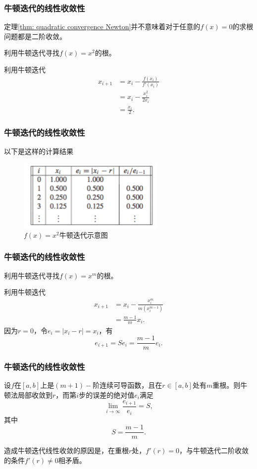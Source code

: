 \documentclass[10pt]{beamer}
\begin{document}
\begin{frame}
\frametitle{牛顿迭代的线性收敛性}
定理\ref{thm: quadratic convergence Newton}并不意味着对于任意的$f(x) = 0$的求根问题都是二阶收敛。
\begin{example}
利用牛顿迭代寻找$f(x) = x^2$的根。
\end{example}
利用牛顿迭代
\begin{align}
x_{i+1} & = x_i - \frac{f(x_i)}{f'(x_i)} \nonumber \\
            & = x_i - \frac{x_i^2}{2x_i} \nonumber \\
            & = \frac{x_i}{2}.
\end{align}
\end{frame}


\begin{frame}
\frametitle{牛顿迭代的线性收敛性}
以下是这样的计算结果
\begin{figure}
\includegraphics[width=6 cm]{figs/Newton_Ex_2_Results.png} 
\caption{$f(x) = x^2$牛顿迭代示意图} 
\end{figure}
\end{frame}


\begin{frame}
\frametitle{牛顿迭代的线性收敛性}
\begin{example}
利用牛顿迭代寻找$f(x) = x^m$的根。
\end{example}
利用牛顿迭代
\begin{align}
x_{i+1} & = x_i - \frac{x_i^m}{m(x_i^{m-1})} \nonumber \\
            & = \frac{m-1}{m} x_i.
\end{align}
因为$r = 0$，令$e_i = |x_i - r| = x_i$，有
\begin{equation}
e_{i+1} = S e_i = \frac{m-1}{m} e_i.
\end{equation}
\end{frame}

\begin{frame}
\frametitle{牛顿迭代的线性收敛性}
\begin{theorem}
设$f$在$[a,b]$上是$(m+1)-$阶连续可导函数，且在$r \in [a,b]$处有$m$重根。则牛顿法局部收敛到$r$，而第$i$步的误差的绝对值$e_i$满足
\begin{equation}
\lim_{i \rightarrow \infty} \frac{e_{i+1}}{e_i} = S,
\end{equation}
其中
\begin{equation}
S = \frac{m-1}{m}.
\end{equation}
\end{theorem}

造成牛顿迭代线性收敛的原因是，在重根$r$处，$f'(r) = 0$，与牛顿迭代二阶收敛的条件$f'(r)\neq 0$相矛盾。
\end{frame}
\end{document}

